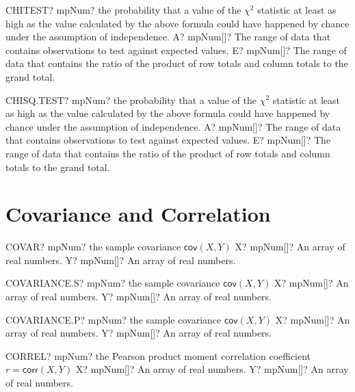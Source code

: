\documentclass[12pt,a4paper,openany]{book}
\begin{document}
\begin{mpFunctionsExtract}
\mpWorksheetFunctionTwoNotImplemented
{CHITEST? mpNum? the probability that a value of the $\chi^2$ statistic at least as high as the value calculated by the above formula could have happened by chance under the assumption of independence.}
{A? mpNum[]? The range of data that contains observations to test against expected values.}
{E? mpNum[]? The range of data that contains the ratio of the product of row totals and column totals to the grand total.}
\end{mpFunctionsExtract}

\begin{mpFunctionsExtract}
\mpWorksheetFunctionTwoNotImplemented
{CHISQ.TEST? mpNum? the probability that a value of the $\chi^2$ statistic at least as high as the value calculated by the above formula could have happened by chance under the assumption of independence.}
{A? mpNum[]? The range of data that contains observations to test against expected values.}
{E? mpNum[]? The range of data that contains the ratio of the product of row totals and column totals to the grand total.}
\end{mpFunctionsExtract}

\section{Covariance and Correlation}

\begin{mpFunctionsExtract}
\mpWorksheetFunctionTwoNotImplemented
{COVAR? mpNum? the sample covariance $\textsf{cov}(X,Y)$}
{X? mpNum[]? An array of real numbers.}
{Y? mpNum[]? An array of real numbers.}
\end{mpFunctionsExtract}

\begin{mpFunctionsExtract}
\mpWorksheetFunctionTwoNotImplemented
{COVARIANCE.S? mpNum? the sample covariance $\textsf{cov}(X,Y)$}
{X? mpNum[]? An array of real numbers.}
{Y? mpNum[]? An array of real numbers.}
\end{mpFunctionsExtract}

\begin{mpFunctionsExtract}
\mpWorksheetFunctionTwoNotImplemented
{COVARIANCE.P? mpNum? the sample covariance $\textsf{cov}(X,Y)$}
{X? mpNum[]? An array of real numbers.}
{Y? mpNum[]? An array of real numbers.}
\end{mpFunctionsExtract}

\begin{mpFunctionsExtract}
\mpWorksheetFunctionTwoNotImplemented
{CORREL? mpNum? the Pearson product moment correlation coefficient  $r = \textsf{corr}(X,Y)$}
{X? mpNum[]? An array of real numbers.}
{Y? mpNum[]? An array of real numbers.}
\end{mpFunctionsExtract}
\end{document}
